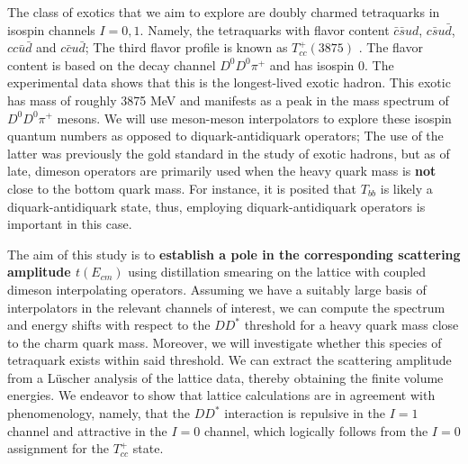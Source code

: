 The class of exotics that we aim to explore are doubly charmed tetraquarks in isospin channels $I=0,1$. Namely, the tetraquarks with flavor content $\bar c\bar s ud$, $c\bar s u\bar d$, $cc\bar u\bar d$ and $c\bar c u\bar d$; The third flavor profile is known as $T_{cc}^+(3875)$ \cite{LHCb:2021vvq}. The flavor content is based on the decay channel $D^0D^0\pi^+$ and has isospin 0. The experimental data shows that this is the longest-lived exotic hadron. This exotic has mass of roughly 3875 MeV and manifests as a peak in the mass spectrum of $D^0D^0\pi^+$ mesons.  We will use meson-meson interpolators to explore these isospin quantum numbers as opposed to diquark-antidiquark operators; The use of the latter was previously the gold standard in the study of exotic hadrons, but as of late, dimeson operators are primarily used when the heavy quark mass is \textbf{not} close to the bottom quark mass. For instance, it is posited that $T_{bb}$ is likely a diquark-antidiquark state, thus, employing diquark-antidiquark operators is important in this case.  

The aim of this study is to \textbf{establish a pole in the corresponding scattering amplitude $t(E_{cm})$} using distillation smearing on the lattice with coupled dimeson interpolating operators. Assuming we have a suitably large basis of interpolators in the relevant channels of interest, we can compute the spectrum and energy shifts with respect to the $DD^*$ threshold for a heavy quark mass close to the charm quark mass. Moreover, we will investigate whether this species of tetraquark exists within said threshold. We can extract the scattering amplitude from a L\"{u}scher analysis of the lattice data, thereby obtaining the finite volume energies. We endeavor to show that lattice calculations are in agreement with phenomenology, namely, that the $DD^*$ interaction is repulsive in the $I=1$ channel and attractive in the $I=0$ channel, which logically follows from the $I=0$ assignment for the $T_{cc}^+$ state. 


